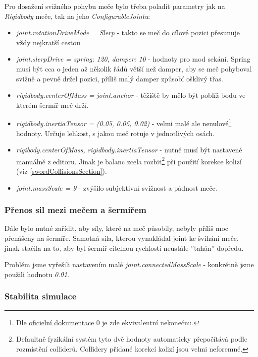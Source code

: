 Pro dosažení svižného pohybu meče bylo třeba poladit parametry jak na \textit{Rigidbody} meče, tak na jeho \textit{ConfigurableJointu}:
\begin{itemize}
  \item \textit{joint.rotationDriveMode = Slerp} - takto se meč do cílové pozici přesunuje vždy nejkratší cestou
  \item \textit{joint.slerpDrive = {spring: 120, damper: 10}} - hodnoty pro mod sekání. Spring musí být cca o jeden až několik řádů větší než damper, aby se meč pohyboval svižně a pevně držel pozici, příliš malý damper způsobí ošklivý třas.
  \item \textit{rigidbody.centerOfMass = joint.anchor} - těžiště by mělo být poblíž bodu ve kterém šermíř meč drží.
  \item \textit{rigidbody.inertiaTensor = (0.05, 0.05, 0.02)} - velmi malé ale nenulové\footnote{Dle \href{https://docs.unity3d.com/ScriptReference/Rigidbody-inertiaTensor.html}{oficielní dokumentace} 0 je zde ekvivalentní nekonečnu.} hodnoty. Určuje lehkost, s jakou meč rotuje v jednotlivých osách.
  \item \textit{rigibody.centerOfMass, rigidbody.inertiaTensor} - nutně musí být nastavené manuálně z editoru. Jinak je balanc zcela rozbit\footnote{Defaultně fyzikální systém tyto dvě hodnoty automaticky přepočítává podle rozmístění colliderů. Collidery přidané korekcí kolizí jsou velmi neforemné.} při použití korekce kolizí (viz \ref{swordCollisionsSection}).
  \item \textit{joint.massScale = 9} - zvýšilo subjektivní svižnost a pádnost meče.
\end{itemize}

\subsubsection*{Přenos sil mezi mečem a šermířem}

Dále bylo nutné zařídit, aby síly, které na meč působily, nebyly příliš moc přenášeny na šermíře. Samotná síla, kterou vynakládal joint ke švihání meče, jinak stačila na to, aby byl šermíř citelnou rychlostí neustále ''tahán'' dopředu.

Problém jsme vyřešili nastavením malé \textit{joint.connectedMassScale} - konkrétně jsme použili hodnotu \textit{0.01}.

\subsubsection*{Stabilita simulace}

